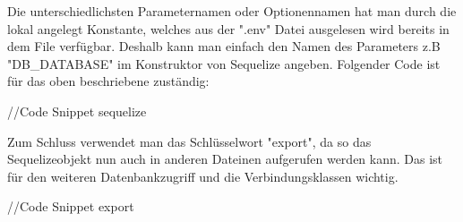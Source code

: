 Die unterschiedlichsten Parameternamen oder Optionennamen hat man durch die lokal angelegt Konstante, welches aus der ".env" Datei ausgelesen wird bereits in dem File verfügbar. Deshalb kann man einfach den Namen des Parameters z.B "DB\_DATABASE" im Konstruktor von Sequelize angeben. Folgender Code ist für das oben beschriebene zuständig:

//Code Snippet sequelize

Zum Schluss verwendet man das Schlüsselwort "export", da so das Sequelizeobjekt nun auch in anderen Dateinen aufgerufen werden kann. Das ist für den weiteren Datenbankzugriff und die Verbindungsklassen wichtig.

//Code Snippet export

